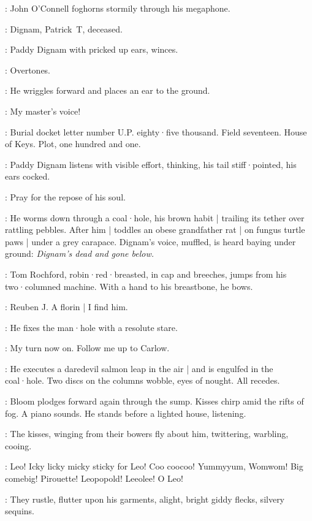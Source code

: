 :
John O'Connell foghorns stormily through his megaphone.

\OConnell:
Dignam,
Patrick~T,
deceased.

:
Paddy Dignam with pricked up ears,
winces.

\Dignam:
Overtones.

:
He wriggles forward and places an ear to the ground.

\Dignam:
My master's voice!

\OConnell:
Burial docket letter number U.P.
eighty·five thousand.
Field seventeen.
House of Keys.
Plot,
one hundred and one.

:
Paddy Dignam listens with visible effort,
thinking,
his tail stiff·pointed,
his ears cocked.

\Dignam:
Pray for the repose of his soul.

:
He worms down through a coal·hole,
his brown habit |
trailing its tether over rattling pebbles.
After him |
toddles an obese grandfather rat |
on fungus turtle paws |
under a grey carapace.
Dignam's voice,
muffled,
is heard baying under ground:
\emph{Dignam's dead and gone below.}

:
Tom Rochford,
robin·red·breasted,
in cap and breeches,
%
jumps from his two·columned machine.
With a hand to his breastbone,
he bows.

\Rochford:
Reuben J.
A florin |
I find him.

:
He fixes the man·hole with a resolute stare.

\Rochford:
My turn now on.
Follow me up to Carlow.

:
He executes a daredevil salmon leap in the air |
and is engulfed in the coal·hole.
Two discs on the columns wobble,
eyes of nought.
All recedes.

:
Bloom plodges forward again through the sump.
Kisses chirp amid the rifts of fog.
A piano sounds.
He stands before a lighted house,
listening.

:
The kisses,
winging from their bowers fly about him,
twittering,
warbling,
cooing.

\Kisses:
Leo!
Icky licky micky sticky for Leo!
Coo coocoo!
Yummyyum,
Womwom!
Big comebig!
Pirouette!
Leopopold!
Leeolee!
O Leo!

:
They rustle,
flutter upon his garments,
alight,
bright giddy flecks,
silvery sequins.

